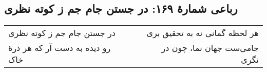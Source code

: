 \begin{center}
\section*{رباعی شمارهٔ ۱۶۹: در جستن جام جم ز کوته نظری}
\label{sec:169}
\begin{longtable}{l p{0.5cm} r}
در جستن جام جم ز کوته نظری
&&
هر لحظه گمانی نه به تحقیق بری
\\
رو دیده به دست آر که هر ذرهٔ خاک
&&
جامی‌ست جهان نما، چون در نگری
\\
\end{longtable}
\end{center}
